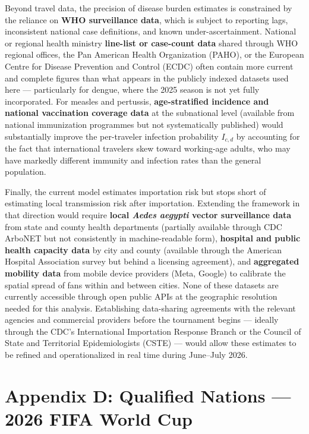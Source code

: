 \documentclass[12pt]{article}
\begin{document}
Beyond travel data, the precision of disease burden estimates is
constrained by the reliance on \textbf{WHO surveillance data}, which is
subject to reporting lags, inconsistent national case definitions, and
known under-ascertainment. National or regional health ministry
\textbf{line-list or case-count data} shared through WHO regional offices,
the Pan American Health Organization (PAHO), or the European Centre for
Disease Prevention and Control (ECDC) often contain more current and
complete figures than what appears in the publicly indexed datasets used
here --- particularly for dengue, where the 2025 season is not yet fully
incorporated. For measles and pertussis, \textbf{age-stratified incidence
and national vaccination coverage data} at the subnational level (available
from national immunization programmes but not systematically published)
would substantially improve the per-traveler infection probability
$I_{c,d}$ by accounting for the fact that international travelers skew
toward working-age adults, who may have markedly different immunity and
infection rates than the general population.

Finally, the current model estimates importation risk but stops short
of estimating local transmission risk after importation. Extending the
framework in that direction would require \textbf{local
\textit{Aedes aegypti} vector surveillance data} from state and
county health departments (partially available through CDC ArboNET but
not consistently in machine-readable form), \textbf{hospital and
public health capacity data} by city and county (available through
the American Hospital Association survey but behind a licensing
agreement), and \textbf{aggregated mobility data} from mobile device
providers (Meta, Google) to calibrate the spatial spread of fans
within and between cities. None of these datasets are currently
accessible through open public APIs at the geographic resolution
needed for this analysis. Establishing data-sharing agreements with
the relevant agencies and commercial providers before the tournament
begins --- ideally through the CDC's International Importation
Response Branch or the Council of State and Territorial Epidemiologists
(CSTE) --- would allow these estimates to be refined and operationalized
in real time during June--July 2026.

\newpage
\section*{Appendix D: Qualified Nations --- 2026 FIFA World Cup}
\end{document}
